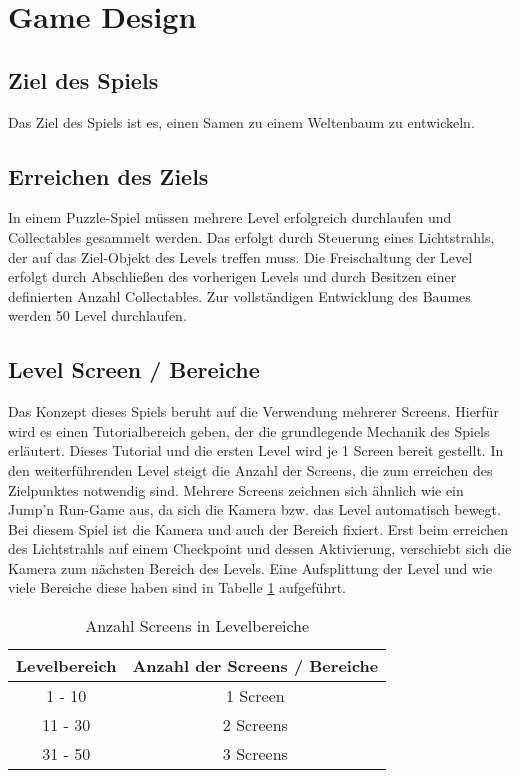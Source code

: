 \section{Game Design}

\subsection{Ziel des Spiels}
Das Ziel des Spiels ist es, einen Samen zu einem Weltenbaum zu entwickeln. 

\subsection{Erreichen des Ziels}
In einem Puzzle-Spiel müssen mehrere Level erfolgreich durchlaufen und Collectables gesammelt werden. Das erfolgt durch Steuerung eines Lichtstrahls, der auf das Ziel-Objekt des Levels treffen muss. Die Freischaltung der Level erfolgt durch Abschließen des vorherigen Levels und durch Besitzen einer definierten Anzahl Collectables. Zur vollständigen Entwicklung des Baumes werden 50 Level durchlaufen.

\subsection{Level Screen / Bereiche}
Das Konzept dieses Spiels beruht auf die Verwendung mehrerer Screens. Hierfür wird es einen Tutorialbereich geben, der die grundlegende Mechanik des Spiels erläutert. Dieses Tutorial und die ersten Level wird je 1 Screen bereit gestellt. In den weiterführenden Level steigt die Anzahl der Screens, die zum erreichen des Zielpunktes notwendig sind. Mehrere Screens zeichnen sich ähnlich wie ein Jump'n Run-Game aus, da sich die Kamera bzw. das Level automatisch bewegt. Bei diesem Spiel ist die Kamera und auch der Bereich fixiert. Erst beim erreichen des Lichtstrahls auf einem Checkpoint und dessen Aktivierung, verschiebt sich die Kamera zum nächsten Bereich des Levels. Eine Aufsplittung der Level und wie viele Bereiche diese haben sind in Tabelle \ref{screenLevel} aufgeführt.

\begin{table}[H]
\centering
\begin{tabular}{c|c}
Levelbereich & Anzahl der Screens / Bereiche \\ \hline
1 - 10  & 1 Screen \\ 
11 - 30 & 2 Screens \\
31 - 50 & 3 Screens      
\end{tabular}
\caption{Anzahl Screens in Levelbereiche}
\label{screenLevel}
\end{table}

